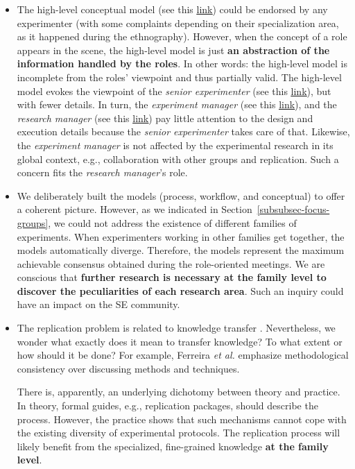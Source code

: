 \begin{itemize}
	\item The high-level conceptual model (see this \href{https://zenodo.org/record/7102405#.YyxvFOzMLUK}{\ul{link}}) could be endorsed by any experimenter (with some complaints depending on their specialization area, as it happened during the ethnography). However, when the concept of a role appears in the scene, the high-level model is just \textbf{an abstraction of the information handled by the roles}. In other words: the high-level model is incomplete from the roles' viewpoint and thus partially valid. The high-level model evokes the viewpoint of the \textit{senior experimenter} (see this \href{https://zenodo.org/record/7102464#.YyxvsezMLUK}{\ul{link}}), but with fewer details. In turn, the \textit{experiment manager} (see this \href{https://zenodo.org/record/7102450#.Yyxv6ezMLUL}{\ul{link}}), and the \textit{research manager} (see this \href{https://zenodo.org/record/7102431#.YyxwGezMLUL}{\ul{link}}) pay little attention to the design and execution details because the \textit{senior experimenter} takes care of that. Likewise, the \textit{experiment manager} is not affected by the experimental research in its global context, e.g., collaboration with other groups and replication. Such a concern fits the \textit{research manager}'s role. 
\item We deliberately built the models (process, workflow, and conceptual) to offer a coherent picture. However, as we indicated in Section~\ref{subsubsec-focus-groups}, we could not address the existence of different families of experiments. When experimenters working in other families get together, the models automatically diverge. Therefore, the models represent the maximum achievable consensus obtained during the role-oriented meetings. We are conscious that \textbf{further research is necessary at the family level to discover the peculiarities of each research area}. Such an inquiry could have an impact on the SE community. 
\item The replication problem is related to knowledge transfer \cite{Shull-2004-Knowledge-sharing-issues-SE}. Nevertheless, we wonder what exactly does it mean to transfer knowledge? To what extent or how should it be done? For example, Ferreira \textit{et al.} \cite{Ferreira-2017-planning-experiments} emphasize methodological consistency over discussing methods and techniques. 

There is, apparently, an underlying dichotomy between theory and practice. In theory, formal guides, e.g., replication packages, should describe the process. However, the practice shows that such mechanisms cannot cope with the existing diversity of experimental protocols. The replication process will likely benefit from the specialized, fine-grained knowledge \textbf{at the family level}.
\end{itemize}

